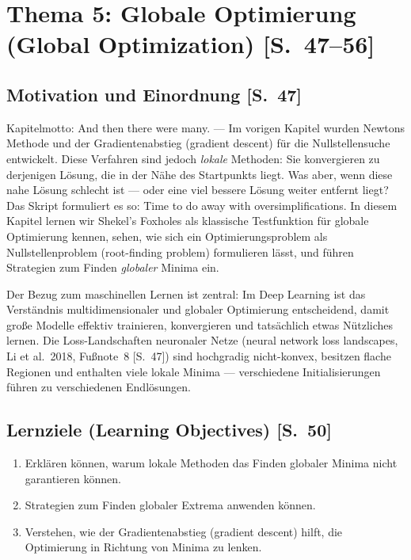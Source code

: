 \section{Thema 5: Globale Optimierung (Global Optimization) [S.~47--56]}

\subsection{Motivation und Einordnung [S.~47]}

Kapitelmotto: \glqq And then there were many.\grqq{} --- Im vorigen Kapitel wurden
Newtons Methode und der Gradientenabstieg (gradient descent) für die Nullstellensuche
entwickelt. Diese Verfahren sind jedoch \emph{lokale} Methoden: Sie konvergieren zu
derjenigen Lösung, die in der Nähe des Startpunkts liegt. Was aber, wenn diese nahe
Lösung schlecht ist --- oder eine viel bessere Lösung weiter entfernt liegt? Das Skript
formuliert es so: \glqq Time to do away with oversimplifications.\grqq{} In diesem Kapitel
lernen wir Shekel's Foxholes als klassische Testfunktion für globale Optimierung kennen,
sehen, wie sich ein Optimierungsproblem als Nullstellenproblem (root-finding problem)
formulieren lässt, und führen Strategien zum Finden \emph{globaler} Minima ein.

Der Bezug zum maschinellen Lernen ist zentral: Im Deep Learning ist das Verständnis
multidimensionaler und globaler Optimierung entscheidend, damit gro{\ss}e Modelle effektiv
trainieren, konvergieren und tatsächlich etwas Nützliches lernen. Die Loss-Landschaften
neuronaler Netze (neural network loss landscapes, Li et al.\ 2018, Fu{\ss}note~8 [S.~47])
sind hochgradig nicht-konvex, besitzen flache Regionen und enthalten viele lokale
Minima --- verschiedene Initialisierungen führen zu verschiedenen Endlösungen.

\subsection{Lernziele (Learning Objectives) [S.~50]}
\begin{enumerate}[itemsep=1pt]
  \item Erklären können, warum lokale Methoden das Finden globaler Minima nicht
        garantieren können.
  \item Strategien zum Finden globaler Extrema anwenden können.
  \item Verstehen, wie der Gradientenabstieg (gradient descent) hilft, die Optimierung
        in Richtung von Minima zu lenken.
\end{enumerate}

